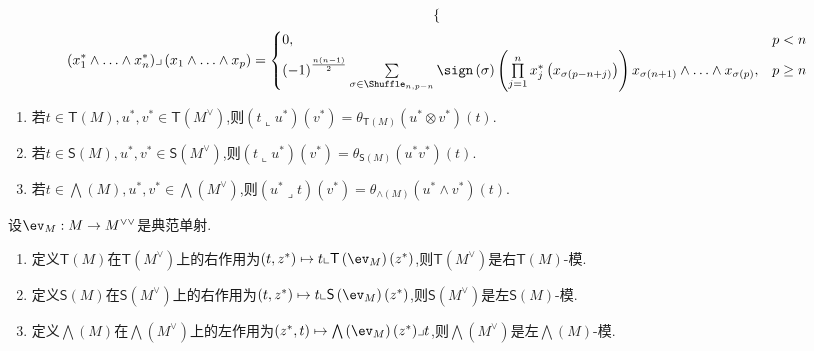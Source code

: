 \begin{theorem}{}{}
\begin{gather*}
\begin{cases}
		\end{cases}\\
		\left(x_{1}^{\ast}\wedge\ldots\wedge x_{n}^{\ast}\right)\lrcorner\left(x_{1}\wedge\ldots\wedge x_{p}\right)=
		\begin{cases}
			0,&p<n\\
			\left(-1\right)^{\frac{n\left(n-1\right)}{2}}\sum\limits_{\sigma\in\Shuffle_{n,p-n}}\sign\left(\sigma\right)\left(\prod\limits_{j=1}^{n}x_{j}^{\ast}\left(x_{\sigma\left(p-n+j\right)}\right)\right)x_{\sigma\left(n+1\right)}\wedge\ldots\wedge x_{\sigma\left(p\right)},&p\geq n
		\end{cases}
	\end{gather*}
\end{theorem}

\begin{proposition}{}{}
	\begin{enumerate}
		\item 若$t\in\mathsf{T}\left(M\right),u^{\ast},v^{\ast}\in\mathsf{T}\left(M^{\vee}\right)$,则$\left(t\llcorner u^{\ast}\right)\left(v^{\ast}\right)=\theta_{\mathsf{T}\left(M\right)}\left(u^{\ast}\otimes v^{\ast}\right)\left(t\right)$.
		\item 若$t\in\mathsf{S}\left(M\right),u^{\ast},v^{\ast}\in\mathsf{S}\left(M^{\vee}\right)$,则$\left(t\llcorner u^{\ast}\right)\left(v^{\ast}\right)=\theta_{\mathsf{S}\left(M\right)}\left(u^{\ast}v^{\ast}\right)\left(t\right)$.
		\item 若$t\in\bigwedge\left(M\right),u^{\ast},v^{\ast}\in\bigwedge\left(M^{\vee}\right)$,则$\left(u^{\ast}\lrcorner t\right)\left(v^{\ast}\right)=\theta_{\wedge\left(M\right)}\left(u^{\ast}\wedge v^{\ast}\right)\left(t\right)$.
	\end{enumerate}
\end{proposition}

\begin{definition}{}{}
	设$\ev_{M}:M\to M^{\vee\vee}$是典范单射.
	\begin{enumerate}
		\item 定义$\mathsf{T}\left(M\right)$在$\mathsf{T}\left(M^{\vee}\right)$上的右作用为$\left(t,z^{\ast}\right)\mapsto t\llcorner\mathsf{T}\left(\ev_{M}\right)\left(z^{\ast}\right)$,则$\mathsf{T}\left(M^{\vee}\right)$是右$\mathsf{T}\left(M\right)$-模.
		\item 定义$\mathsf{S}\left(M\right)$在$\mathsf{S}\left(M^{\vee}\right)$上的右作用为$\left(t,z^{\ast}\right)\mapsto t\llcorner\mathsf{S}\left(\ev_{M}\right)\left(z^{\ast}\right)$,则$\mathsf{S}\left(M^{\vee}\right)$是左$\mathsf{S}\left(M\right)$-模.
		\item 定义$\bigwedge\left(M\right)$在$\bigwedge\left(M^{\vee}\right)$上的左作用为$\left(z^{\ast},t\right)\mapsto\bigwedge\left(\ev_{M}\right)\left(z^{\ast}\right)\lrcorner t$,则$\bigwedge\left(M^{\vee}\right)$是左$\bigwedge\left(M\right)$-模.
	\end{enumerate}
\end{definition}

